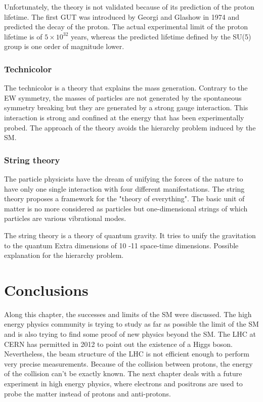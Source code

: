       Unfortunately, the theory is not validated because of its prediction of the proton lifetime. 
      The first GUT was introduced by Georgi and Glashow in 1974 and predicted the decay of the proton. 
      The actual experimental limit of the proton lifetime is of $5 \times 10^{32}$ years, whereas the predicted lifetime defined by the SU(5) group is one order of magnitude lower.
      \cite{Agashe:2014kda}

      \subsubsection{Technicolor}

      The technicolor is a theory that explains the mass generation.
      Contrary to the EW symmetry, the masses of particles are not generated by the spontaneous symmetry breaking but they are generated by a strong gauge interaction.
      This interaction is strong and confined at the energy that has been experimentally probed.
      The approach of the theory avoids the hierarchy problem induced by the \gls{SM}.
      
      \subsubsection{String theory}

      The particle physicists have the dream of unifying the forces of the nature to have only one single interaction with four different manifestations.
      The string theory proposes a framework for the "theory of everything".
      The basic unit of matter is no more considered as particles but one-dimensional strings of which particles are various vibrational modes.

      The string theory is a theory of quantum gravity.
      It tries to unify the gravitation to the quantum 
      Extra dimensions of 10 -11 space-time dimensions.
      Possible explanation for the hierarchy problem.

    \section{Conclusions}

    Along this chapter, the successes and limits of the \gls{SM} were discussed.
    The high energy physics community is trying to study as far as possible the limit of the \gls{SM} and is also trying to find some proof of new physics beyond the \gls{SM}.
    The \gls{LHC} at CERN has permitted in 2012 to point out the existence of a Higgs boson.  
    Nevertheless, the beam structure of the LHC is not efficient enough to perform very precise measurements.
    Because of the collision between protons, the energy of the collision can't be exactly known.
    The next chapter deals with a future experiment in high energy physics, where electrons and positrons are used to probe the matter instead of protons and anti-protons.

